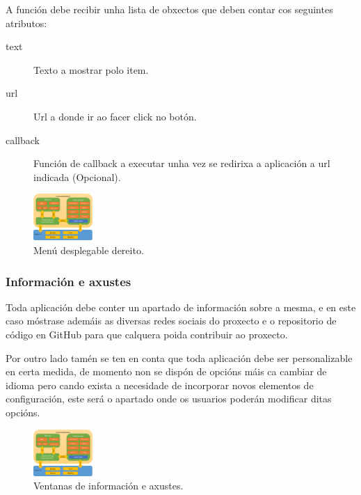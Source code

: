       A función debe recibir unha lista de obxectos que deben contar cos 
seguintes atributos:

      \begin{description}
       \item [text] Texto a mostrar polo item.
       \item [url] Url a donde ir ao facer click no botón.
       \item [callback] Función de callback a executar unha vez se 
redirixa a aplicación a url indicada (Opcional).
      \end{description}

      \begin{figure}[h!]
        \begin{center}
        \includegraphics[width=0.2\textwidth]{./img/cordova_arquitectura.png}
        \caption{Menú desplegable dereito.}
        \end{center}
      \end{figure}


      \subsubsection{Información e axustes}
      Toda aplicación debe conter un apartado de información sobre a mesma, e 
en este caso móstrase ademáis as diversas redes sociais do proxecto e o 
repositorio de código en GitHub para que calquera poida contribuir ao proxecto.

      Por outro lado tamén se ten en conta que toda aplicación debe ser 
personalizable en certa medida, de momento non se dispón de opcións máis ca 
cambiar de idioma pero cando exista a necesidade de incorporar 
novos elementos de configuración, este será o apartado onde os usuarios poderán 
modificar ditas opcións.

      \begin{figure}[h!]
        \begin{center}
        \includegraphics[width=0.2\textwidth]{./img/cordova_arquitectura.png}
        \caption{Ventanas de información e axustes.}
        \end{center}
      \end{figure}

